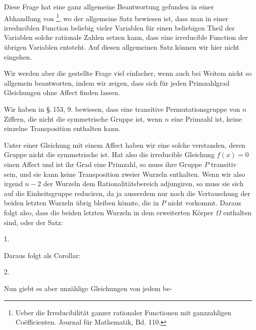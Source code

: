 
Diese Frage hat eine ganz allgemeine Beantwortung gefunden in einer Abhandlung von \footnote{Ueber die Irreducibilit\"at ganzer rationaler Functionen mit ganzzahligen Co\"efficienten. Journal f\"ur Mathematik, Bd. 110.}, wo der allgemeine Satz bewiesen ist, dass man in einer irreduciblen Function beliebig vieler Variablen f\"ur einen beliebigen Theil der Variablen solche rationale Zahlen setzen kann, dass eine irreducible Function der \"ubrigen Variablen entsteht. Auf diesen allgemeinen Satz k\"onnen wir hier nicht eingehen.

Wir werden aber die gestellte Frage viel einfacher, wenn auch bei Weitem nicht so allgemein beantworten, indem wir zeigen, dass sich f\"ur jeden Primzahlgrad Gleichungen ohne Affect finden lassen.

Wir haben in \S.\,153, 9. bewiesen, dass eine transitive Permutationsgruppe von $n$ Ziffern, die nicht die symmetrische Gruppe ist, wenn $n$ eine Primzahl ist, keine einzelne Transposition enthalten kann.

Unter einer Gleichung mit einem Affect haben wir eine solche verstanden, deren Gruppe nicht die symmetrische ist. Hat also die irreducible Gleichung $f(x) = 0$ einen Affect und ist ihr Grad eine Primzahl, so muss ihre Gruppe $P$ transitiv sein, und sie kann keine Transposition zweier Wurzeln enthalten. Wenn wir also irgend $n - 2$ der Wurzeln dem Rationalit\"atsbereich adjungiren, so muss sie sich auf die Einheitsgruppe reduciren, da ja ausserdem nur noch die Vertauschung der beiden letzten Wurzeln \"ubrig bleiben k\"onnte, die in $P$ nicht vorkommt. Daraus folgt also, dass die beiden letzten Wurzeln in dem erweiterten K\"orper $\Omega$ enthalten sind, oder der Satz:

1. 

Daraus folgt als Corollar:

2. 

Nun giebt es aber unz\"ahlige Gleichungen von jedem be-

